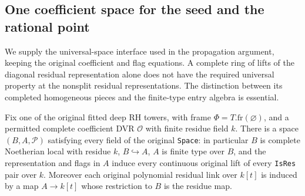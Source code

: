 \subsection{One coefficient space for the seed and the rational point}
\label{subsec:rh-four-common-space}

We supply the universal-space interface used in the propagation
argument, keeping the original coefficient and flag equations.
A complete ring of lifts of the diagonal residual representation
alone does not have the required universal property at the
nonsplit residual representations. The distinction between its
completed homogeneous pieces and the finite-type entry algebra is
essential.

\begin{theorem}
\label{thm:rh-four-space}
Fix one of the original fitted deep RH towers, with frame
$\Phi=T.\mathrm{fr}(\varnothing)$, and a permitted complete
coefficient DVR $\mathcal O$ with finite residue field $k$.
There is a space $(B,A,\mathcal P)$ satisfying every field of
the original \texttt{Space}: in particular $B$ is complete
Noetherian local with residue $k$, $B\hookrightarrow A$,
$A$ is finite type over $B$, and the representation and flags
in $A$ induce every continuous original lift of every
\texttt{IsRes} pair over $k$. Moreover each original polynomial
residual link over $k[t]$ is induced by a map $A\to k[t]$
whose restriction to $B$ is the residue map.
\end{theorem}

